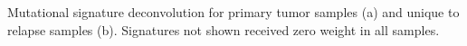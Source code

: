 Mutational signature deconvolution for primary tumor samples (a) and unique to relapse samples (b). Signatures not shown received zero weight in all samples.